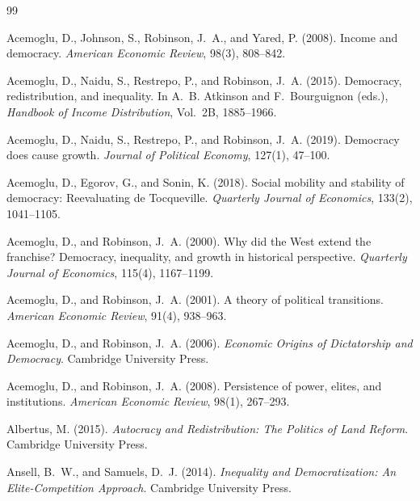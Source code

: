 \documentclass[11pt]{article}
\theoremstyle{remark}
\begin{document}
\begin{thebibliography}{99}

Acemoglu, D., Johnson, S., Robinson, J.~A., and Yared, P. (2008).
Income and democracy.
\emph{American Economic Review}, 98(3), 808--842.

Acemoglu, D., Naidu, S., Restrepo, P., and Robinson, J.~A. (2015).
Democracy, redistribution, and inequality.
In A.~B. Atkinson and F.~Bourguignon (eds.), \emph{Handbook of Income Distribution}, Vol.~2B, 1885--1966.

Acemoglu, D., Naidu, S., Restrepo, P., and Robinson, J.~A. (2019).
Democracy does cause growth.
\emph{Journal of Political Economy}, 127(1), 47--100.

Acemoglu, D., Egorov, G., and Sonin, K. (2018).
Social mobility and stability of democracy: Reevaluating de Tocqueville.
\emph{Quarterly Journal of Economics}, 133(2), 1041--1105.

Acemoglu, D., and Robinson, J.~A. (2000).
Why did the West extend the franchise? Democracy, inequality, and growth in historical perspective.
\emph{Quarterly Journal of Economics}, 115(4), 1167--1199.

Acemoglu, D., and Robinson, J.~A. (2001).
A theory of political transitions.
\emph{American Economic Review}, 91(4), 938--963.

Acemoglu, D., and Robinson, J.~A. (2006).
\emph{Economic Origins of Dictatorship and Democracy}.
Cambridge University Press.

Acemoglu, D., and Robinson, J.~A. (2008).
Persistence of power, elites, and institutions.
\emph{American Economic Review}, 98(1), 267--293.

Albertus, M. (2015).
\emph{Autocracy and Redistribution: The Politics of Land Reform}.
Cambridge University Press.

Ansell, B.~W., and Samuels, D.~J. (2014).
\emph{Inequality and Democratization: An Elite-Competition Approach}.
Cambridge University Press.


\end{thebibliography}
\end{document}
